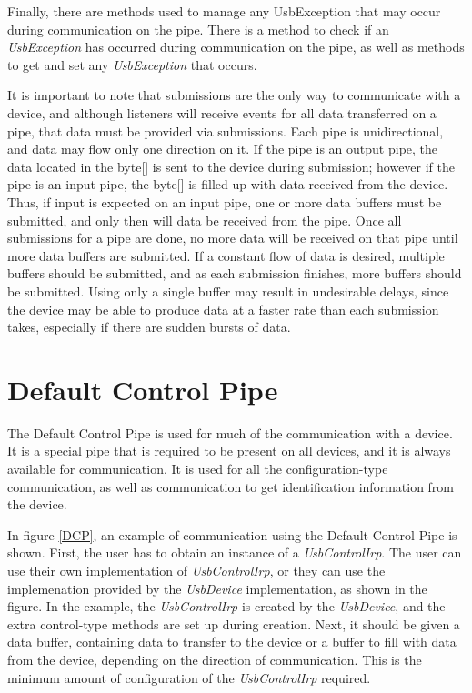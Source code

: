 \documentclass{article}
\newcommand{\myclass}[1]{\emph{#1}}
\newcommand{\myinterface}[1]{\emph{#1}}
\newcommand{\mysectionend}[0]{\vfill\pagebreak[1]}
\begin{document}
Finally, there are methods used to manage any UsbException that may occur during
communication on the pipe.  There is a method to check if an \myclass{UsbException} has
occurred during communication on the pipe, as well as methods to get and set any
\myclass{UsbException} that occurs.

It is important to note that submissions are the only way to communicate
with a device, and although listeners will receive events for all data
transferred on a pipe, that data must be provided via submissions.
Each pipe is unidirectional, and data may flow only one direction on it.
If the pipe is an output pipe, the data located in the byte[] is sent
to the device during submission; however if the pipe is an input pipe,
the byte[] is filled up with data received from the device.  Thus,
if input is expected on an input pipe, one or more data buffers
must be submitted, and only then will data be received from the pipe.
Once all submissions for a pipe are done, no more data will be received on
that pipe until more data buffers are submitted.  If a constant flow
of data is desired, multiple buffers should be submitted, and as each
submission finishes, more buffers should be submitted.  Using only
a single buffer may result in undesirable delays, since the device
may be able to produce data at a faster rate than each submission takes,
especially if there are sudden bursts of data.

\mysectionend

%

\section{Default Control Pipe}

The Default Control Pipe is used for much of the communication with a device.
It is a special pipe that is required to be present on all devices, and it is
always available for communication.  It is used for all the configuration-type
communication, as well as communication to get identification information from
the device.

In figure \ref{DCP}, an example of communication using the Default Control Pipe
is shown.  First, the user has to obtain an instance of a \myinterface{UsbControlIrp}.  The
user can use their own implementation of \myinterface{UsbControlIrp}, or they can use the
implemenation provided by the \myinterface{UsbDevice} implementation, as shown in the figure.
In the example, the \myinterface{UsbControlIrp} is created by the \myinterface{UsbDevice}, and the extra
control-type methods are set up during creation.  Next, it should be given
a data buffer, containing data to transfer to the device or a buffer to
fill with data from the device, depending on the direction of communication.
This is the minimum amount of configuration of the \myinterface{UsbControlIrp} required.
\end{document}
